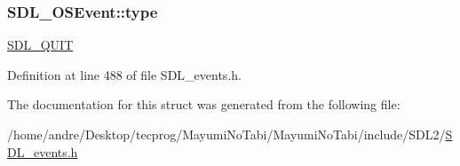 \hypertarget{struct_s_d_l___o_s_event_a85a600619ebebc8db007fc757b3895a5}{
\subsubsection[{type}]{ S\-D\-L\-\_\-\-O\-S\-Event\-::type}}\label{struct_s_d_l___o_s_event_a85a600619ebebc8db007fc757b3895a5}
\hyperlink{_s_d_l__events_8h_a3b589e89be6b35c02e0dd34a55f3fccaa31acc5fdafc86ebe2c1f5c3cae48d603}{S\-D\-L\-\_\-\-Q\-U\-I\-T} 

Definition at line 488 of file S\-D\-L\-\_\-events.\-h.



The documentation for this struct was generated from the following file\-:\begin{DoxyCompactItemize}
\item 
/home/andre/\-Desktop/tecprog/\-Mayumi\-No\-Tabi/\-Mayumi\-No\-Tabi/include/\-S\-D\-L2/\hyperlink{_s_d_l__events_8h}{S\-D\-L\-\_\-events.\-h}\end{DoxyCompactItemize}
